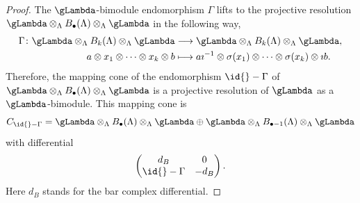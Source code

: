 \documentclass[a4paper]{amsart}
\begin{document}
\begin{proof}
  The \(\gLambda\)-bimodule endomorphism \(\Gamma\) lifts to the projective resolution \(\gLambda\otimes_{\Lambda}B_{\bullet}(\Lambda)\otimes_{\Lambda}\gLambda\) in the following way,
  \begin{align*}
      \Gamma\colon\gLambda\otimes_{\Lambda}B_{k}(\Lambda)\otimes_{\Lambda}\gLambda & \longrightarrow \gLambda\otimes_{\Lambda}B_{k}(\Lambda)\otimes_{\Lambda}\gLambda,  \\
      a\otimes  x_1\otimes\cdots\otimes  x_k\otimes b                                                  & \longmapsto a\imath^{-1}\otimes \sigma(x_1)\otimes\cdots\otimes \sigma(x_k)\otimes\imath b.
  \end{align*}
  Therefore, the mapping cone of the endomorphism \(\id{}-\Gamma\) of \(\gLambda\otimes_{\Lambda}B_{\bullet}(\Lambda)\otimes_{\Lambda}\gLambda\) is a projective resolution of \(\gLambda\) as a \(\gLambda\)-bimodule. This mapping cone is
  \[C_{\id{}-\Gamma}=\gLambda\otimes_{\Lambda}B_{\bullet}(\Lambda)\otimes_{\Lambda}\gLambda
      \oplus
      \gLambda\otimes_{\Lambda}B_{\bullet-1}(\Lambda)\otimes_{\Lambda}\gLambda\]
  with differential
  \[\begin{pmatrix}
          d_B            & 0  \\
          \id{}-\Gamma & -d_B
      \end{pmatrix}.\]
  Here $d_B$ stands for the bar complex differential.


\end{proof}
\end{document}
